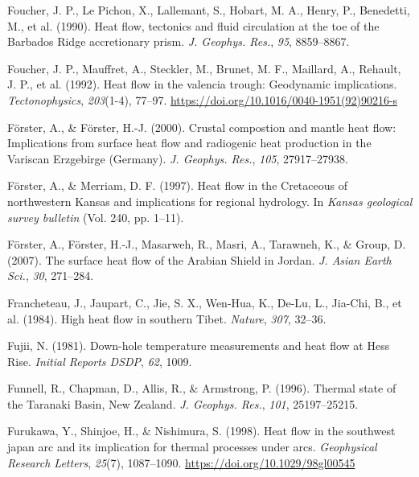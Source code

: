 \documentclass[draft,linenumbers]{agujournal2018}
\begin{document}
\leavevmode{}%
Foucher, J. P., Le Pichon, X., Lallemant, S., Hobart, M. A., Henry, P.,
Benedetti, M., et al. (1990). Heat flow, tectonics and fluid circulation
at the toe of the {Barbados Ridge} accretionary prism. \emph{J. Geophys.
Res.}, \emph{95}, 8859--8867.

\leavevmode{}%
Foucher, J. P., Mauffret, A., Steckler, M., Brunet, M. F., Maillard, A.,
Rehault, J. P., et al. (1992). Heat flow in the valencia trough:
Geodynamic implications. \emph{Tectonophysics}, \emph{203}(1-4), 77--97.
\url{https://doi.org/10.1016/0040-1951(92)90216-s}

\leavevmode{}%
Förster, A., \& Förster, H.-J. (2000). Crustal compostion and mantle
heat flow: Implications from surface heat flow and radiogenic heat
production in the {Variscan Erzgebirge (Germany)}. \emph{J. Geophys.
Res.}, \emph{105}, 27917--27938.

\leavevmode{}%
Förster, A., \& Merriam, D. F. (1997). Heat flow in the {Cretaceous} of
northwestern {Kansas} and implications for regional hydrology. In
\emph{Kansas geological survey bulletin} (Vol. 240, pp. 1--11).

\leavevmode{}%
Förster, A., Förster, H.-J., Masarweh, R., Masri, A., Tarawneh, K., \&
Group, D. (2007). The surface heat flow of the {Arabian Shield in
Jordan}. \emph{J. Asian Earth Sci.}, \emph{30}, 271--284.

\leavevmode{}%
Francheteau, J., Jaupart, C., Jie, S. X., Wen-Hua, K., De-Lu, L.,
Jia-Chi, B., et al. (1984). High heat flow in southern {Tibet}.
\emph{Nature}, \emph{307}, 32--36.

\leavevmode{}%
Fujii, N. (1981). Down-hole temperature measurements and heat flow at
{Hess Rise}. \emph{Initial Reports DSDP}, \emph{62}, 1009.

\leavevmode{}%
Funnell, R., Chapman, D., Allis, R., \& Armstrong, P. (1996). Thermal
state of the {Taranaki Basin, New Zealand}. \emph{J. Geophys. Res.},
\emph{101}, 25197--25215.

\leavevmode{}%
Furukawa, Y., Shinjoe, H., \& Nishimura, S. (1998). Heat flow in the
southwest japan arc and its implication for thermal processes under
arcs. \emph{Geophysical Research Letters}, \emph{25}(7), 1087--1090.
\url{https://doi.org/10.1029/98gl00545}
\end{document}
